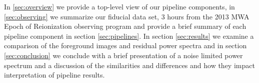 \documentclass[preprint]{aastex}
\def\eppsilon{{\it $\epsilon$ppsilon }}
\def\implicitcov{{\emph EMPCOV }}
\def\chipscite{Trott et al 2015}
\def\eppsiloncite{Hazelton et al 2015}
\def\dilloncite{Dillon et al 2015}
\begin{document}
In \ref{sec:overview} we provide a top-level view of our pipeline components, in \ref{sec:observing} we summarize  our fiducial data set, 3 hours from the 2013 MWA Epoch of Reionization observing program and provide a brief summary of each pipeline component in section \ref{sec:pipelines}. In section \ref{sec:results} we examine a comparison of the foreground images and residual power spectra and in section \ref{sec:conclusion} we conclude with a brief presentation of a noise limited power spectrum and a discussion of the similarities and differences and how they impact interpretation of pipeline results.

%
%
% 
\end{document}

